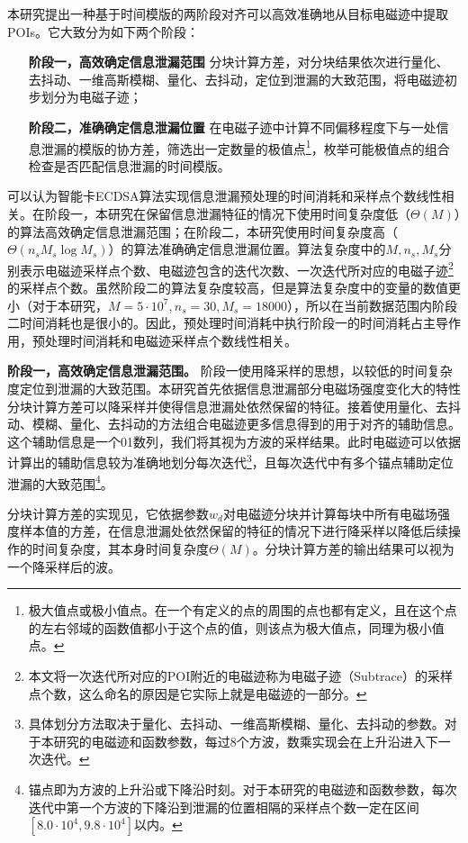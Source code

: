 {	本研究提出一种基于时间模版的两阶段对齐可以高效准确地从目标电磁迹中提取POIs。它大致分为如下两个阶段：
	
	\begin{itemize}
		\item [\textbf{阶段一，高效确定信息泄漏范围}]分块计算方差，对分块结果依次进行量化、去抖动、一维高斯模糊、量化、去抖动，定位到泄漏的大致范围，将电磁迹初步划分为电磁子迹；
		\item [\textbf{阶段二，准确确定信息泄漏位置}]在电磁子迹中计算不同偏移程度下与一处信息泄漏的模版的协方差，筛选出一定数量的极值点\footnote{极大值点或极小值点。在一个有定义的点的周围的点也都有定义，且在这个点的左右邻域的函数值都小于这个点的值，则该点为极大值点，同理为极小值点。}，枚举可能极值点的组合检查是否匹配信息泄漏的时间模版。
	\end{itemize}

	可以认为智能卡ECDSA算法实现信息泄漏预处理的时间消耗和采样点个数线性相关。在阶段一，本研究在保留信息泄漏特征的情况下使用时间复杂度低（$\Theta(M)$）的算法高效确定信息泄漏范围；在阶段二，本研究使用时间复杂度高（$\Theta(n_sM_s\log M_s)$）的算法准确确定信息泄漏位置。算法复杂度中的$M,n_s,M_s$分别表示电磁迹采样点个数、电磁迹包含的迭代次数、一次迭代所对应的电磁子迹\footnote{本文将一次迭代所对应的POI附近的电磁迹称为电磁子迹（Subtrace）的采样点个数，这么命名的原因是它实际上就是电磁迹的一部分。}的采样点个数。虽然阶段二的算法复杂度较高，但是算法复杂度中的变量的数值更小（对于本研究，$M=5\cdot10^7,n_s=30,M_s=18000$），所以在当前数据范围内阶段二时间消耗也是很小的。因此，预处理时间消耗中执行阶段一的时间消耗占主导作用，预处理时间消耗和电磁迹采样点个数线性相关。

	\textbf{阶段一，高效确定信息泄漏范围。}	
	阶段一使用降采样的思想，以较低的时间复杂度定位到泄漏的大致范围。本研究首先依据信息泄漏部分电磁场强度变化大的特性分块计算方差可以降采样并使得信息泄漏处依然保留的特征。接着使用量化、去抖动、模糊、量化、去抖动的方法组合电磁迹更多信息得到的用于对齐的辅助信息。这个辅助信息是一个01数列，我们将其视为方波的采样结果。此时电磁迹可以依据计算出的辅助信息较为准确地划分每次迭代\footnote{具体划分方法取决于量化、去抖动、一维高斯模糊、量化、去抖动的参数。对于本研究的电磁迹和函数参数，每过8个方波，数乘实现会在上升沿进入下一次迭代。}，且每次迭代中有多个锚点辅助定位泄漏的大致范围\footnote{锚点即为方波的上升沿或下降沿时刻。对于本研究的电磁迹和函数参数，每次迭代中第一个方波的下降沿到泄漏的位置相隔的采样点个数一定在区间$[8.0\cdot10^{4},9.8\cdot10^{4}]$以内。}。
	
	分块计算方差的实现见，它依据参数$w_d$对电磁迹分块并计算每块中所有电磁场强度样本值的方差，在信息泄漏处依然保留的特征的情况下进行降采样以降低后续操作的时间复杂度，其本身时间复杂度$\Theta(M)$。分块计算方差的输出结果可以视为一个降采样后的波。
	
}
